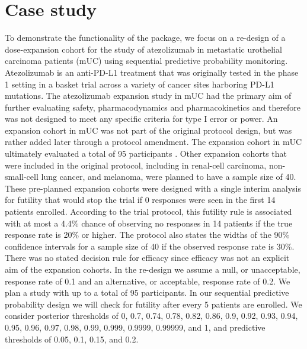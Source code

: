 \hypertarget{case-study}{%
\section{Case study}\label{case-study}}

To demonstrate the functionality of the  package, we
focus on a re-design of a dose-expansion cohort for the study of
atezolizumab in metastatic urothelial carcinoma patients (mUC) using
sequential predictive probability monitoring. Atezolizumab is an
anti-PD-L1 treatment that was originally tested in the phase 1 setting
in a basket trial across a variety of cancer sites harboring PD-L1
mutations. The atezolizumab expansion study in mUC had the primary aim
of further evaluating safety, pharmacodynamics and pharmacokinetics and
therefore was not designed to meet any specific criteria for type I
error or power. An expansion cohort in mUC was not part of the original
protocol design, but was rather added later through a protocol
amendment. The expansion cohort in mUC ultimately evaluated a total of
95 participants \citep{Powles2014}. Other expansion cohorts that were
included in the original protocol, including in renal-cell carcinoma,
non-small-cell lung cancer, and melanoma, were planned to have a sample
size of 40. These pre-planned expansion cohorts were designed with a
single interim analysis for futility that would stop the trial if 0
responses were seen in the first 14 patients enrolled. According to the
trial protocol, this futility rule is associated with at most a 4.4\%
chance of observing no responses in 14 patients if the true response
rate is 20\% or higher. The protocol also states the widths of the 90\%
confidence intervals for a sample size of 40 if the observed response
rate is 30\%. There was no stated decision rule for efficacy since
efficacy was not an explicit aim of the expansion cohorts. In the
re-design we assume a null, or unacceptable, response rate of 0.1 and an
alternative, or acceptable, response rate of 0.2. We plan a study with
up to a total of 95 participants. In our sequential predictive
probability design we will check for futility after every 5 patients are
enrolled. We consider posterior thresholds of 0, 0.7, 0.74, 0.78, 0.82,
0.86, 0.9, 0.92, 0.93, 0.94, 0.95, 0.96, 0.97, 0.98, 0.99, 0.999,
0.9999, 0.99999, and 1, and predictive thresholds of 0.05, 0.1, 0.15,
and 0.2.

